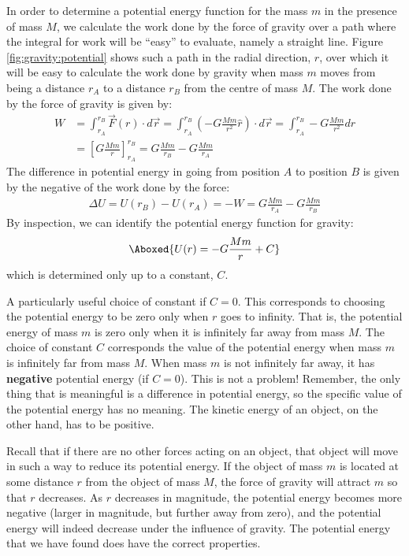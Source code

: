 In order to determine a potential energy function for the mass $m$ in the presence of mass $M$, we calculate the work done by the force of gravity over a path where the integral for work will be ``easy'' to evaluate, namely a straight line. Figure \ref{fig:gravity:potential} shows such a path in the radial direction, $r$, over which it will be easy to calculate the work done by gravity when mass $m$ moves from being a distance $r_A$ to a distance $r_B$ from the centre of mass $M$.
The work done by the force of gravity is given by:
\begin{align*}
W &= \int_{r_A}^{r_B}\vec F(r) \cdot d\vec r = \int_{r_A}^{r_B} \left(- G\frac{Mm}{r^2}\hat r \right)\cdot d\vec r =\int_{r_A}^{r_B} - G\frac{Mm}{r^2}dr\\
&=\left[G\frac{Mm}{r} \right]_{r_A}^{r_B} =G\frac{Mm}{r_B} - G\frac{Mm}{r_A}
\end{align*}
The difference in potential energy in going from position $A$ to position $B$ is given by the negative of the work done by the force:
\begin{align*}
\Delta U = U(r_B) - U(r_A) = -W = G\frac{Mm}{r_A} - G\frac{Mm}{r_B}
\end{align*}
By inspection, we can identify the potential energy function for gravity:
\begin{align}
\Aboxed{U(r) = -G\frac{Mm}{r} + C}
\end{align}
which is determined only up to a constant, $C$. 

A particularly useful choice of constant if $C=0$. This corresponds to choosing the potential energy to be zero only when $r$ goes to infinity. That is, the potential energy of mass $m$ is zero only when it is infinitely far away from mass $M$. The choice of constant $C$ corresponds the value of the potential energy when mass $m$ is infinitely far from mass $M$. When mass $m$ is not infinitely far away, it has \textbf{negative} potential energy (if $C=0$). This is not a problem! Remember, the only thing that is meaningful is a difference in potential energy, so the specific value of the potential energy has no meaning. The kinetic energy of an object, on the other hand, has to be positive.

Recall that if there are no other forces acting on an object, that object will move in such a way to reduce its potential energy. If the object of mass $m$ is located at some distance $r$ from the object of mass $M$, the force of gravity will attract $m$ so that $r$ decreases. As $r$ decreases in magnitude, the potential energy becomes more negative (larger in magnitude, but further away from zero), and the potential energy will indeed decrease under the influence of gravity. The potential energy that we have found does have the correct properties.

